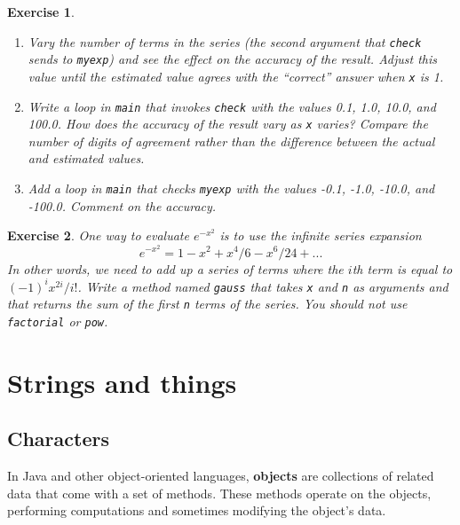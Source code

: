 \documentclass[12pt]{book}
\theoremstyle{exercise}
\newtheorem{exercise}{Exercise}[chapter]
\begin{document}
\begin{exercise}
\begin{enumerate}
\item Vary the number of terms in the series (the second argument
that {\tt check} sends to {\tt myexp}) and see the effect on
the accuracy of the result.  Adjust this value until the estimated
value agrees with the ``correct'' answer when {\tt x} is 1.

\item Write a loop in {\tt main} that invokes {\tt check} with the
values 0.1, 1.0, 10.0, and 100.0.  How does the accuracy of the
result vary as {\tt x} varies?  Compare the number of digits of
agreement rather than the difference between the actual and
estimated values.

\item Add a loop in {\tt main} that checks {\tt myexp} with the values
-0.1, -1.0, -10.0, and -100.0.  Comment on the accuracy.

\end{enumerate}
\end{exercise}


\begin{exercise}
One way to evaluate $e^{-x^2}$ is to use the infinite series expansion
%
\begin{equation*}
e^{-x^2} = 1 - x^2 + x^4/6 - x^6/24 + ...
\end{equation*}
%
In other words, we need to add up a series of terms where the $i$th
term is equal to $(-1)^i x^{2i} / i!$.  Write a method named {\tt gauss}
that takes {\tt x} and {\tt n} as arguments and that returns the sum
of the first {\tt n} terms of the series.  You should not use {\tt
factorial} or {\tt pow}.
\end{exercise}


\chapter{Strings and things}
\label{chap07}
\label{strings}

\section{Characters}

In Java and other object-oriented languages, {\bf objects} are collections
of related data that come with a set of methods.  These methods
operate on the objects, performing computations and sometimes
modifying the object's data.
\end{document}
